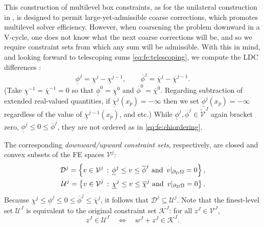 \documentclass[letterpaper,final,12pt,reqno]{amsart}
\theoremstyle{cstyle}
\theoremstyle{cstyle*}
\theoremstyle{dstyle}
\numberwithin{equation}{section}
\numberwithin{figure}{section}
\numberwithin{table}{section}
\numberwithin{theorem}{section}
\begin{document}
This construction of multilevel box constraints, as for the unilateral construction in \cite{GraeserKornhuber2009}, is designed to permit large-yet-admissible coarse corrections, which promotes multilevel solver efficiency.  However, when coarsening the problem downward in a V-cycle, one does not know what the next coarse corrections will be, and so we require constraint sets from which any sum will be admissible.  With this in mind, and looking forward to telescoping sums \eqref{eq:fe:telescoping}, we compute the LDC differences \cite{GraeserKornhuber2009}:
\begin{equation}
\underline{\phi}^j = \underline{\chi}^j - \underline{\chi}^{j-1}, \qquad \overline{\phi}^j = \overline{\chi}^j - \overline{\chi}^{j-1}.  \label{eq:fe:philevels}
\end{equation}
(Take $\underline{\chi}^{-1}=\overline{\chi}^{-1}=0$ so that $\underline{\phi}^0=\underline{\chi}^0$ and $\overline{\phi}^0=\overline{\chi}^0$.  Regarding subtraction of extended real-valued quantities, if $\underline{\chi}^j(x_p)=-\infty$ then we set $\underline{\phi}^j(x_p)=-\infty$ regardless of the value of $\underline{\chi}^{j-1}(x_p)$, and etc.)  While $\underline{\phi}^{j},\overline{\phi}^{j} \in \tilde{\mathcal{V}}^J$ again bracket zero, $\underline{\phi}^j \le 0 \le \overline{\phi}^j$, they are not ordered as in \eqref{eq:fe:chiordering}.

The corresponding \emph{downward/upward constraint sets}, respectively, are closed and convex subsets of the FE spaces $\mathcal{V}^j$:
\begin{align}
\mathcal{D}^j = \left\{v \in \mathcal{V}^j \,:\, \underline{\phi}^j \le v \le \overline{\phi}^j \text{ and } \, v|_{\partial_D\Omega} = 0\right\}, \label{eq:fe:constraintsets} \\
\mathcal{U}^j = \left\{v \in \mathcal{V}^j \,:\, \underline{\chi}^j \le v \le \overline{\chi}^j \text{ and } \, v|_{\partial_D\Omega} = 0\right\}. \notag
\end{align}
Because $\underline{\chi}^j \le \underline{\phi}^j \le 0 \le \overline{\phi}^j \le \overline{\chi}^j$, it follows that $\mathcal{D}^j \subseteq \mathcal{U}^j$.  Note that the finest-level set $\mathcal{U}^J$ is equivalent to the original constraint set $\mathcal{K}^J$: for all $z^J \in \mathcal{V}^J$,
\begin{equation}
z^J \in \mathcal{U}^J \quad \iff \quad w^J+z^J \in \mathcal{K}^J. \label{eq:fe:finestlevelequivalent}
\end{equation}
\end{document}
